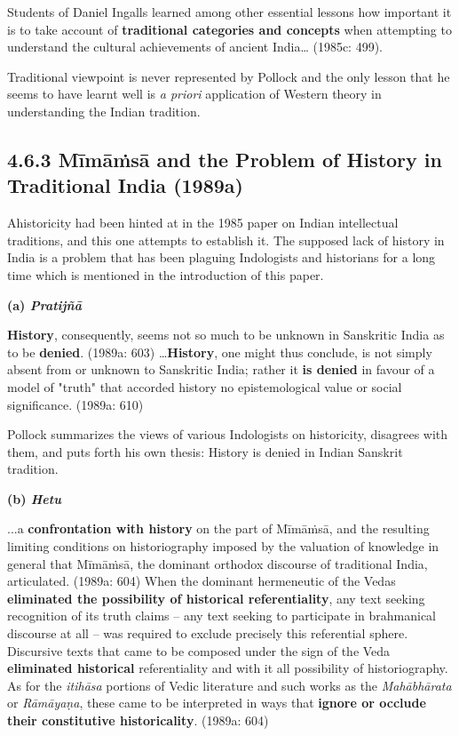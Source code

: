 \begin{myquote}
Students of Daniel Ingalls learned among other essential lessons how important it is to take account of \textbf{traditional categories and concepts} when attempting to understand the cultural achievements of ancient India… (1985c: 499).
\end{myquote}

Traditional viewpoint is never represented by Pollock and the only lesson that he seems to have learnt well is \textit{a priori} application of Western theory in understanding the Indian tradition.


\subsection*{4.6.3 Mīmāṁsā and the Problem of History in Traditional India (1989a)}

Ahistoricity had been hinted at in the 1985 paper on Indian intellectual traditions, and this one attempts to establish it. The supposed lack of history in India is a problem that has been plaguing Indologists and historians for a long time which is mentioned in the introduction of this paper.

\textbf{(a) \textit{Pratijñā }}

\begin{myquote}
\textbf{History}, consequently, seems not so much to be unknown in Sanskritic India as to be \textbf{denied}. (1989a: 603) …\textbf{History}, one might thus conclude, is not simply absent from or unknown to Sanskritic India; rather it \textbf{is denied} in favour of a model of "truth" that accorded history no epistemological value or social significance. (1989a: 610)
\end{myquote}

Pollock summarizes the views of various Indologists on historicity, disagrees with them, and puts forth his own thesis: History is denied in Indian Sanskrit tradition.

\textbf{(b) \textit{Hetu}}

\begin{myquote}
...a \textbf{confrontation with history} on the part of Mīmāṁsā, and the resulting limiting conditions on historiography imposed by the valuation of knowledge in general that Mīmāṁsā, the dominant orthodox discourse of traditional India, articulated. (1989a: 604) When the dominant hermeneutic of the Vedas \textbf{eliminated the possibility of historical referentiality}, any text seeking recognition of its truth claims – any text seeking to participate in brahmanical discourse at all – was required to exclude precisely this referential sphere. Discursive texts that came to be composed under the sign of the Veda \textbf{eliminated historical} referentiality and with it all possibility of historiography. As for the \textit{itihāsa} portions of Vedic literature and such works as the \textit{Mahābhārata} or \textit{Rāmāyaṇa}, these came to be interpreted in ways that \textbf{ignore or occlude their constitutive historicality}. (1989a: 604)
\end{myquote}

